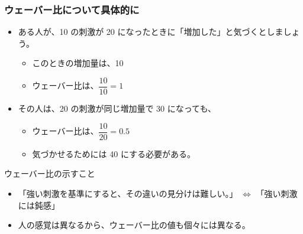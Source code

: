 \documentclass[12pt, dvipdfmx]{beamer}
\begin{document}
\begin{frame}
	\frametitle{ウェーバー比について具体的に}
	\begin{itemize}
		\item ある人が、10 の刺激が 20 になったときに「増加した」と気づくとしましょう。
		\begin{itemize}
			\item このときの増加量は、10
		\item ウェーバー比は、$\dfrac{10}{10} = 1$
		\end{itemize}
		\item その人は、20 の刺激が同じ増加量で 30 になっても、
		\begin{itemize}
			\item ウェーバー比は、$\dfrac{10}{20} = 0.5$
			\item 気づかせるためには 40 にする必要がある。
		\end{itemize}
	\end{itemize}
	\begin{alertblock}{ウェーバー比の示すこと}
		\begin{itemize}
			\item 「強い刺激を基準にすると、その違いの見分けは難しい。」
			$\Leftrightarrow$ \alert{「強い刺激には鈍感」}
			\item 人の感覚は異なるから、ウェーバー比の値も個々には異なる。
		\end{itemize}
	\end{alertblock}
\end{frame}
\end{document}
